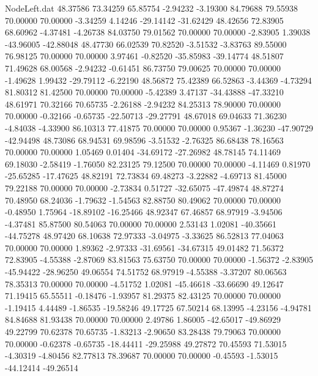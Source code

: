 \begin{filecontents}{NodeLeft.dat}
  48.37586   73.34259   65.85754    -2.94232   -3.19300   84.79688   79.55938   70.00000   70.00000   -3.34259    4.14246  -29.14142  -31.62429
  48.42656   72.83905   68.60962    -4.37481   -4.26738   84.03750   79.01562   70.00000   70.00000   -2.83905    1.39038  -43.96005  -42.88048
  48.47730   66.02539   70.82520    -3.51532   -3.83763   89.55000   76.98125   70.00000   70.00000    3.97461   -0.82520  -35.85983  -39.14774
  48.51807   71.49628   68.00568    -2.94232   -0.61451   86.73750   79.00625   70.00000   70.00000   -1.49628    1.99432  -29.79112   -6.22190
  48.56872   75.42389   66.52863    -3.44369   -4.73294   81.80312   81.42500   70.00000   70.00000   -5.42389    3.47137  -34.43888  -47.33210
  48.61971   70.32166   70.65735    -2.26188   -2.94232   84.25313   78.90000   70.00000   70.00000   -0.32166   -0.65735  -22.50713  -29.27791
  48.67018   69.04633   71.36230    -4.84038   -4.33900   86.10313   77.41875   70.00000   70.00000    0.95367   -1.36230  -47.90729  -42.94498
  48.73086   68.94531   69.98596    -3.51532   -2.76325   86.68438   78.16563   70.00000   70.00000    1.05469    0.01404  -34.69172  -27.26982
  48.78145   74.11469   69.18030    -2.58419   -1.76050   82.23125   79.12500   70.00000   70.00000   -4.11469    0.81970  -25.65285  -17.47625
  48.82191   72.73834   69.48273    -3.22882   -4.69713   81.45000   79.22188   70.00000   70.00000   -2.73834    0.51727  -32.65075  -47.49874
  48.87274   70.48950   68.24036    -1.79632   -1.54563   82.88750   80.49062   70.00000   70.00000   -0.48950    1.75964  -18.89102  -16.25466
  48.92347   67.46857   68.97919    -3.94506   -4.37481   85.87500   80.54063   70.00000   70.00000    2.53143    1.02081  -40.35661  -44.75278
  48.97420   68.10638   72.97333    -3.04975   -3.33625   86.52813   77.04063   70.00000   70.00000    1.89362   -2.97333  -31.69561  -34.67315
  49.01482   71.56372   72.83905    -4.55388   -2.87069   83.81563   75.63750   70.00000   70.00000   -1.56372   -2.83905  -45.94422  -28.96250
  49.06554   74.51752   68.97919    -4.55388   -3.37207   80.06563   78.35313   70.00000   70.00000   -4.51752    1.02081  -45.46618  -33.66690
  49.12647   71.19415   65.55511    -0.18476   -1.93957   81.29375   82.43125   70.00000   70.00000   -1.19415    4.44489   -1.86535  -19.58246
  49.17725   67.50214   68.13995    -4.23156   -4.94781   84.84688   81.93438   70.00000   70.00000    2.49786    1.86005  -42.65017  -49.86929
  49.22799   70.62378   70.65735    -1.83213   -2.90650   83.28438   79.79063   70.00000   70.00000   -0.62378   -0.65735  -18.44411  -29.25988
  49.27872   70.45593   71.53015    -4.30319   -4.80456   82.77813   78.39687   70.00000   70.00000   -0.45593   -1.53015  -44.12414  -49.26514

\end{filecontents}
